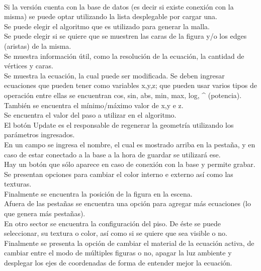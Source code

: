 \documentclass[12pt]{article}
\begin{document}
\\Si la versión cuenta con la base de datos (es decir si existe conexión con la misma) se puede optar utilizando la lista desplegable por cargar una.
\\Se puede elegir el algoritmo que es utilizado para generar la malla.
\\Se puede elegir si se quiere que se muestren las caras de la figura y/o los edges (aristas) de la misma.
\\Se muestra información útil, como la resolución de la ecuación, la cantidad de vértices y caras.
\\Se muestra la ecuación, la cual puede ser modificada. Se deben ingresar ecuaciones que pueden tener como variables x,y,z; que pueden usar varios tipos de operación entre ellas se encuentran cos, sin, abs, min, max, log, \string^ (potencia).
\\También se encuentra el mínimo/máximo valor de x,y e z.
\\Se encuentra el valor del paso a utilizar en el algoritmo.
\\El botón Update es el responsable de regenerar la geometría utilizando los parámetros ingresados.
\\En un campo se ingresa el nombre, el cual es mostrado arriba en la pestaña, y en caso de estar conectado a la base a la hora de guardar se utilizará ese.
\\Hay un botón que sólo aparece en caso de conexión con la base y permite grabar.
\\Se presentan opciones para cambiar el color interno e externo así como las texturas.
\\Finalmente se encuentra la posición de la figura en la escena.
\\Afuera de las pestañas se encuentra una opción para agregar más ecuaciones (lo que genera más pestañas). 
\\En otro sector se encuentra la configuración del piso. De éste se puede seleccionar, su textura o color, así como si se quiere que sea visible o no.
\\Finalmente se presenta la opción de cambiar el material de la ecuación activa, de cambiar entre el modo de múltiples figuras o no, apagar la luz ambiente y desplegar los ejes de coordenadas de forma de entender mejor la ecuación.
\end{document}
